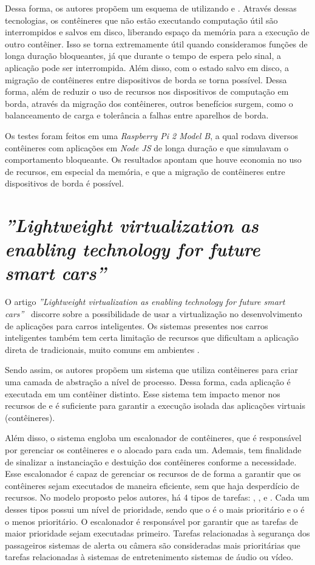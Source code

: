Dessa forma, os autores propõem um esquema de \checkpointing utilizando \docker e \criu. Através dessas tecnologias, os contêineres que não estão executando computação útil são interrompidos e salvos em disco, liberando espaço da memória para a execução de outro contêiner. Isso se torna extremamente útil quando consideramos funções de longa duração bloqueantes, já que durante o tempo de espera pelo sinal, a aplicação pode ser interrompida. Além disso, com o estado salvo em disco, a migração de contêineres entre dispositivos \iot de borda se torna possível. Dessa forma, além de reduzir o uso de recursos nos dispositivos de computação em borda, através da migração dos contêineres, outros benefícios surgem, como o balanceamento de carga e tolerância a falhas entre aparelhos \iot de borda.

Os testes foram feitos em uma \textit{Raspberry Pi 2 Model B}, a qual rodava diversos contêineres com aplicações em \textit{Node JS} de longa duração e que simulavam o comportamento bloqueante. Os resultados apontam que houve economia no uso de recursos, em especial da memória, e que a migração de contêineres entre dispositivos \iot de borda é possível.

\section{ \textit{''Lightweight virtualization as enabling technology for future smart cars''}}

O artigo \textit{''Lightweight virtualization as enabling technology for future smart cars''}~\cite{smartcarslwvirtualization} discorre sobre a possibilidade de usar a virtualização no desenvolvimento de aplicações para carros inteligentes. Os sistemas presentes nos carros inteligentes também tem certa limitação de recursos que dificultam a aplicação direta de \hypervisors tradicionais, muito comuns em ambientes \cloud.

Sendo assim, os autores propõem um sistema que utiliza contêineres \docker para criar uma camada de abstração a nível de processo. Dessa forma, cada aplicação é executada em um contêiner distinto. Esse sistema tem impacto menor nos recursos de \hardware e é suficiente para garantir a execução isolada das aplicações virtuais (contêineres).

Além disso, o sistema engloba um escalonador de contêineres, que é responsável por gerenciar os contêineres e o \hardware alocado para cada um. Ademais, tem finalidade de sinalizar a instanciação e destuição dos contêineres conforme a necessidade. Esse escalonador é capaz de gerenciar os recursos de \hardware de forma a garantir que os contêineres sejam executados de maneira eficiente, sem que haja desperdício de recursos. No modelo proposto pelos autores, há 4 tipos de tarefas: \critical, \high, \moderate e \low. Cada um desses tipos possui um nível de prioridade, sendo que o \critical é o mais prioritário e o \low é o menos prioritário. O escalonador é responsável por garantir que as tarefas de maior prioridade sejam executadas primeiro. Tarefas relacionadas à segurança dos passageiros \eg sistemas de alerta ou câmera são consideradas mais prioritárias que tarefas relacionadas à sistemas de entretenimento \eg sistemas de áudio ou vídeo.

